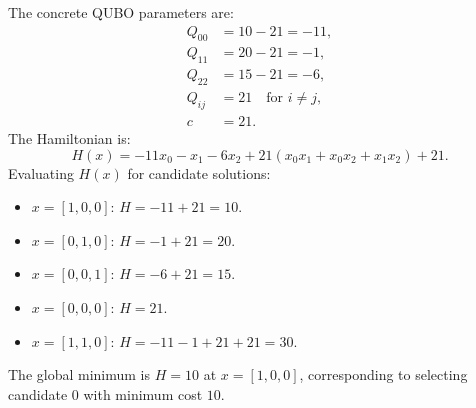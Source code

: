 \documentclass[12pt]{article}
\begin{document}
The concrete QUBO parameters are:
\begin{align}
    Q_{00} &= 10 - 21 = -11, \\
    Q_{11} &= 20 - 21 = -1, \\
    Q_{22} &= 15 - 21 = -6, \\
    Q_{ij} &= 21 \quad \text{for } i \neq j, \\
    c &= 21.
\end{align}
The Hamiltonian is:
\begin{equation}
    H(x) = -11 x_0 - x_1 - 6 x_2 + 21(x_0 x_1 + x_0 x_2 + x_1 x_2) + 21.
\end{equation}
Evaluating $H(x)$ for candidate solutions:
\begin{itemize}
    \item $x = [1, 0, 0]$: $H = -11 + 21 = 10$.
    \item $x = [0, 1, 0]$: $H = -1 + 21 = 20$.
    \item $x = [0, 0, 1]$: $H = -6 + 21 = 15$.
    \item $x = [0, 0, 0]$: $H = 21$.
    \item $x = [1, 1, 0]$: $H = -11 - 1 + 21 + 21 = 30$.
\end{itemize}
The global minimum is $H = 10$ at $x = [1, 0, 0]$, corresponding to selecting candidate $0$ with minimum cost $10$.
\end{document}
